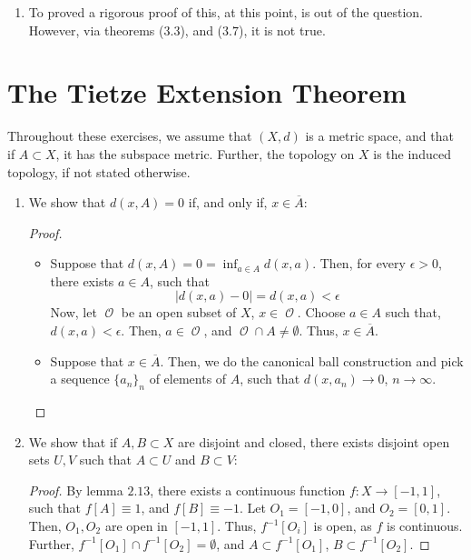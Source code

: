 \documentclass{book}
\DeclareMathOperator*{\Ocal}{\mathcal{O}}
\begin{document}
\begin{enumerate}[(1)]
    \item To proved a rigorous proof of this, at this point, is out of the question. However, via theorems ($3.3$), and ($3.7$), it is not true. 

\end{enumerate}

\section{The Tietze Extension Theorem}
Throughout these exercises, we assume that $(X, d)$ is a metric space, and that if $A \subset X$, it has the subspace metric. Further, the topology on $X$ is the induced topology, if not stated otherwise. 
\begin{enumerate}[(1)]
    \item We show that $d(x,A) = 0$ if, and only if, $x \in \overline{A}$:
        \begin{proof} $ $\newline
            \begin{itemize}
                \item[] Suppose that $d(x,A) = 0 = \inf_{a \in A} d(x,a)$. Then, for every $\epsilon > 0$, there exists $a \in A$, such that 
                    \[|d(x,a) - 0| = d(x,a) < \epsilon \]
                    Now, let ${\Ocal}$ be an open subset of $X$, $x \in {\Ocal}$. Choose $a \in A$ such that, $d(x,a) < \epsilon$. Then, $a \in {\Ocal}$, and ${\Ocal} \cap A \neq \emptyset$. Thus, $x \in \overline{A}$. 

                \item[] Suppose that $x \in \overline{A}$. Then, we do the canonical ball construction and pick a sequence $\{a_n\}_n$ of elements of $A$, such that $d(x, a_n) \rightarrow 0$, $n \rightarrow \infty$. 
            \end{itemize}
        \end{proof}

    \item We show that if $A,B \subset X$ are disjoint and closed, there exists disjoint open sets $U,V$ such that $A \subset U$ and $B \subset V$:
        \begin{proof} By lemma $2.13$, there exists a continuous function $f: X \rightarrow [-1,1]$, such that $f[A] \equiv 1$, and $f[B] \equiv -1$. Let $O_1 = [-1,0]$, and $O_2 = [0,1]$. Then, $O_1, O_2$ are open in $[-1,1]$. Thus, $f^{-1}[O_i]$ is open, as $f$ is continuous. Further, $f^{-1}[O_1] \cap f^{-1}[O_2] = \emptyset$, and $A \subset f^{-1}[O_1]$, $B \subset f^{-1}[O_2]$. 
        \end{proof}


\end{enumerate}
\end{document}
